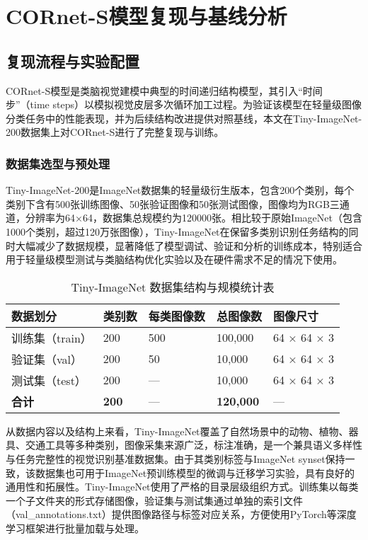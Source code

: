 \chapter{CORnet-S模型复现与基线分析}

\section{复现流程与实验配置}

CORnet-S模型是类脑视觉建模中典型的时间递归结构模型，其引入“时间步”（time steps）以模拟视觉皮层多次循环加工过程。为验证该模型在轻量级图像分类任务中的性能表现，并为后续结构改进提供对照基线，本文在Tiny-ImageNet-200数据集上对CORnet-S进行了完整复现与训练。

\subsection{数据集选型与预处理}

Tiny-ImageNet-200是ImageNet数据集的轻量级衍生版本，包含200个类别，每个类别下含有500张训练图像、50张验证图像和50张测试图像，图像均为RGB三通道，分辨率为64×64，数据集总规模约为120000张\cite{le2015tiny}。相比较于原始ImageNet（包含1000个类别，超过120万张图像），Tiny-ImageNet在保留多类别识别任务结构的同时大幅减少了数据规模，显著降低了模型调试、验证和分析的训练成本，特别适合用于轻量级模型测试与类脑结构优化实验以及在硬件需求不足的情况下使用。

\begin{table}[htb]
	\centering
	\caption{Tiny-ImageNet 数据集结构与规模统计表}
	\label{tab:tinyimagenet}
	\begin{tabular}{lllll}
		\hline
		数据划分 & 类别数 & 每类图像数 & 总图像数 & 图像尺寸 \\
		\hline
		训练集（train） & 200 & 500  & 100,000  & 64 × 64 × 3 \\
		验证集（val）   & 200 & 50   & 10,000   & 64 × 64 × 3 \\
		测试集（test）  & 200 & —    & 10,000   & 64 × 64 × 3 \\
		\textbf{合计}   & \textbf{200} & — & \textbf{120,000} & — \\
		\hline
	\end{tabular}
\end{table}

从数据内容以及结构上来看，Tiny-ImageNet覆盖了自然场景中的动物、植物、器具、交通工具等多种类别，图像采集来源广泛，标注准确，是一个兼具语义多样性与任务完整性的视觉识别基准数据集。由于其类别标签与ImageNet synset保持一致，该数据集也可用于ImageNet预训练模型的微调与迁移学习实验，具有良好的通用性和拓展性。Tiny-ImageNet使用了严格的目录层级组织方式。训练集以每类一个子文件夹的形式存储图像，验证集与测试集通过单独的索引文件（val\_annotations.txt）提供图像路径与标签对应关系，方便使用PyTorch等深度学习框架进行批量加载与处理。


